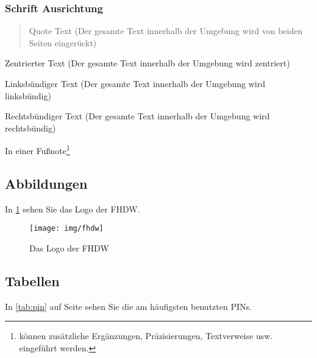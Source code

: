 \subsubsection{Schrift Ausrichtung}
\label{sec:Schrift Ausrichtung}
\begin{quote}
Quote Text (Der gesamte Text innerhalb der Umgebung wird von beiden Seiten eingerückt)
\end{quote}
\begin{center}
Zentrierter Text (Der gesamte Text innerhalb der Umgebung wird zentriert)
\end{center}
\begin{flushleft}
Linksbündiger Text (Der gesamte Text innerhalb der Umgebung wird linksbündig)
\end{flushleft}
\begin{flushright}
Rechtsbündiger Text (Der gesamte Text innerhalb der Umgebung wird rechtsbündig)
\end{flushright}
In einer Fußnote\footnote{können zusätzliche Ergänzungen, Präzisierungen, Textverweise usw. eingeführt werden.}

\subsection{Abbildungen}

In \cref{fig:fhdw} sehen Sie das Logo der FHDW.

\begin{figure}[hbt]
\centering
\begin{minipage}[t]{.7\textwidth} %
\caption{Das Logo der FHDW} %
\texttt{[image: img/fhdw]}\\ %
\label{fig:fhdw}
\end{minipage}
\end{figure}

\subsection{Tabellen}

In \cref{tab:pin} auf Seite \pageref{tab:pin} sehen Sie die am häufigsten benutzten PINs.

